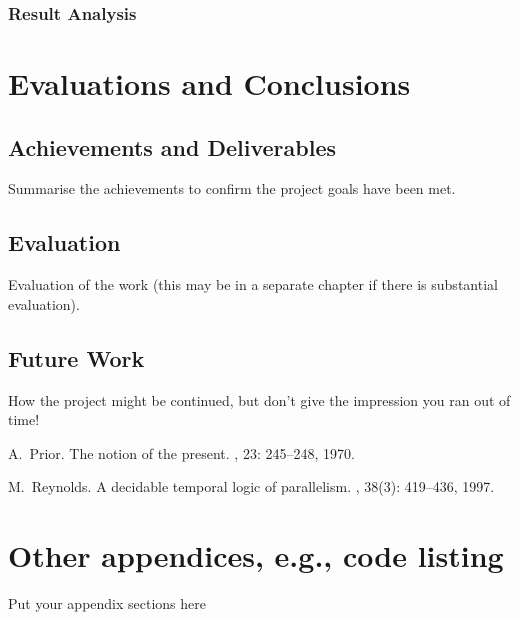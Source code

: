 \documentclass{report}
\begin{document}
\subsection{Result Analysis}


\chapter{Evaluations and Conclusions}
\section{Achievements and Deliverables}
Summarise the achievements to confirm the project goals have been met.
\section{Evaluation}
Evaluation of the work (this may be in a separate chapter if there is substantial evaluation).
\section{Future Work}
How the project might be continued, but don't give the impression you ran out of time!

\appendix


\begin{thebibliography}{HHM99}


A.~Prior.
\newblock The notion of the present.
, 23:  245--248, 1970.


M.~Reynolds.
\newblock A decidable temporal logic of parallelism.
, 38(3):  419--436,
  1997.
\end{thebibliography}
\chapter{Other appendices, e.g., code listing}
Put your appendix sections here
\end{document}
